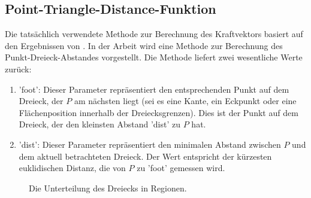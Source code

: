 \documentclass[conference]{IEEEtran}
\begin{document}
\subsection{Point-Triangle-Distance-Funktion}\label{dist}
Die tatsächlich verwendete Methode zur Berechnung des Kraftvektors basiert auf den Ergebnissen von  \autocite*{eberlyDistancePointTriangle}. In der Arbeit wird eine Methode zur Berechnung des Punkt-Dreieck-Abstandes vorgestellt. Die Methode liefert zwei wesentliche Werte zurück:

\begin{enumerate}
    \item 'foot': Dieser Parameter repräsentiert den entsprechenden Punkt auf dem Dreieck, der $P$ am nächsten liegt (sei es eine Kante, ein Eckpunkt oder eine Flächenposition innerhalb der Dreiecksgrenzen). Dies ist der Punkt auf dem Dreieck, der den kleinsten Abstand 'dist' zu $P$ hat.
    \item 'dist': Dieser Parameter repräsentiert den minimalen Abstand zwischen $P$ und dem aktuell betrachteten Dreieck. Der Wert entspricht der kürzesten euklidischen Distanz, die von $P$ zu 'foot' gemessen wird.
\end{enumerate}


\begin{figure}[h] 
    \centering
    \caption{Die Unterteilung des Dreiecks in Regionen.}
    \label{fig:regions}
\end{figure}
\end{document}
